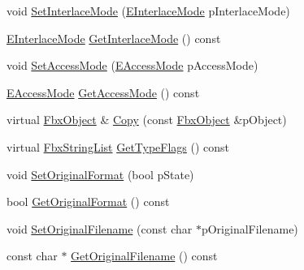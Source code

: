 \begin{DoxyCompactItemize}
\item 
void \hyperlink{class_fbx_video_aa33fec12f17da41767260e59a3165d05}{Set\+Interlace\+Mode} (\hyperlink{class_fbx_video_a1e60229c28a15e29289f3f00b23aa215}{E\+Interlace\+Mode} p\+Interlace\+Mode)
\item 
\hyperlink{class_fbx_video_a1e60229c28a15e29289f3f00b23aa215}{E\+Interlace\+Mode} \hyperlink{class_fbx_video_ac86d64d43fd683b6573b4bfa636aa9d1}{Get\+Interlace\+Mode} () const
\item 
void \hyperlink{class_fbx_video_a7c593f34c56ecb905de956d50048a4f5}{Set\+Access\+Mode} (\hyperlink{class_fbx_video_a6dd88dabb2170adcd8c58952ed2e0c40}{E\+Access\+Mode} p\+Access\+Mode)
\item 
\hyperlink{class_fbx_video_a6dd88dabb2170adcd8c58952ed2e0c40}{E\+Access\+Mode} \hyperlink{class_fbx_video_af03167bd6b840efe8425017fb7a606e3}{Get\+Access\+Mode} () const
\item 
virtual \hyperlink{class_fbx_object}{Fbx\+Object} \& \hyperlink{class_fbx_video_aafd075b5cd4710be1e3f14cd0ede1bce}{Copy} (const \hyperlink{class_fbx_object}{Fbx\+Object} \&p\+Object)
\item 
virtual \hyperlink{class_fbx_string_list}{Fbx\+String\+List} \hyperlink{class_fbx_video_a69adf09a2346176545e330cd2c8f23ad}{Get\+Type\+Flags} () const
\item 
void \hyperlink{class_fbx_video_afc417f0c646bf474cbe976eb76d01099}{Set\+Original\+Format} (bool p\+State)
\item 
bool \hyperlink{class_fbx_video_aa267c61d456e3cbb8317ac85eac1e979}{Get\+Original\+Format} () const
\item 
void \hyperlink{class_fbx_video_a67861ed77b1e7bfd2c1bce310f7406e6}{Set\+Original\+Filename} (const char $\ast$p\+Original\+Filename)
\item 
const char $\ast$ \hyperlink{class_fbx_video_a8657651afd89c2f7811b7056ac8346c9}{Get\+Original\+Filename} () const
\end{DoxyCompactItemize}
